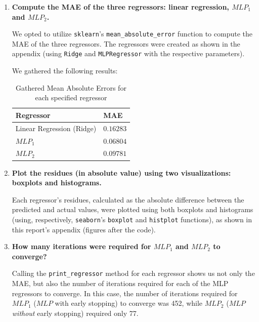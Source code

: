 \documentclass[12pt]{article}
\begin{document}
\begin{enumerate}[leftmargin=\labelsep,resume]
  \item \textbf{Compute the MAE of the three regressors: linear regression, $MLP_1$ and $MLP_2$.}

        We opted to utilize \texttt{sklearn}'s \texttt{mean\_absolute\_error} function to compute the MAE of the three regressors.
        The regressors were created as shown in the appendix (using \texttt{Ridge} and
        \texttt{MLPRegressor} with the respective parameters).

        We gathered the following results:

        \begin{table}[h]
          \centering
          \begin{tabular}{l|l}
            Regressor                 & MAE       \\ \hline
            Linear Regression (Ridge) & $0.16283$ \\
            $MLP_1$                   & $0.06804$ \\
            $MLP_2$                   & $0.09781$
          \end{tabular}
          \caption{Gathered Mean Absolute Errors for each specified regressor}
          \label{tab:mean-absolute-errors}
        \end{table}

  \item \textbf{Plot the residues (in absolute value) using two visualizations: boxplots and histograms.}

        Each regressor's residues, calculated as the absolute difference between
        the predicted and actual values, were plotted using both boxplots and histograms
        (using, respectively, \texttt{seaborn}'s \texttt{boxplot} and \texttt{histplot} functions),
        as shown in this report's appendix (figures after the code).

  \item \textbf{How many iterations were required for $MLP_1$ and $MLP_2$ to converge?}

        Calling the \texttt{print\_regressor} method for each regressor shows us
        not only the MAE, but also the number of iterations required for each of
        the MLP regressors to converge. In this case, the number of iterations
        required for $MLP_1$ ($MLP$ with early stopping) to converge was 452,
        while $MLP_2$ ($MLP$ \textit{without} early stopping) required only 77.


\end{enumerate}
\end{document}
